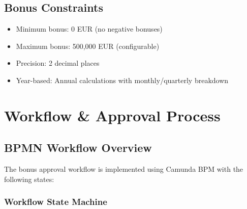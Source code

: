 \documentclass[11pt,a4paper,oneside,openany]{book}
\begin{document}
\section{Bonus Constraints}

\begin{itemize}
    \item Minimum bonus: 0 EUR (no negative bonuses)
    \item Maximum bonus: 500,000 EUR (configurable)
    \item Precision: 2 decimal places
    \item Year-based: Annual calculations with monthly/quarterly breakdown
\end{itemize}

\chapter{Workflow \& Approval Process}

\section{BPMN Workflow Overview}

The bonus approval workflow is implemented using Camunda BPM with the following states:

\subsection{Workflow State Machine}
\end{document}
